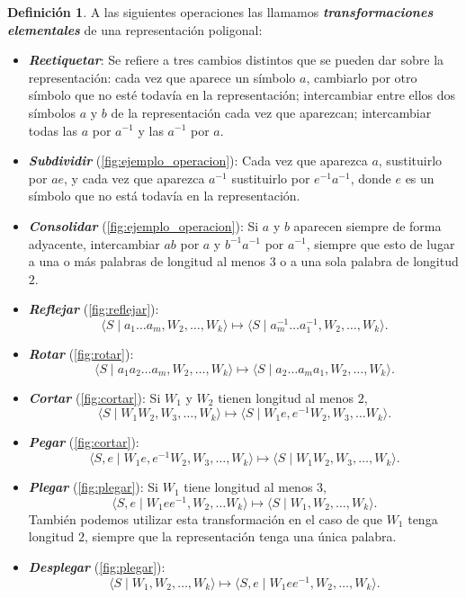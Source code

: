 \documentclass[10pt]{report}
\newcommand{\enfatiza}[1]{\textbf{\textit{#1}}}
\theoremstyle{definition}
\newtheorem{defin}{Definición}[section]
\begin{document}
\begin{defin}%
A las siguientes operaciones las llamamos \enfatiza{transformaciones elementales} de una representación poligonal:
\begin{itemize}
\item \enfatiza{Reetiquetar}: Se refiere a tres cambios distintos que se pueden dar sobre la representación: cada vez que aparece un símbolo $a$, cambiarlo por otro símbolo que no esté todavía en la representación; intercambiar entre ellos dos símbolos $a$ y $b$ de la representación cada vez que aparezcan; intercambiar todas las $a$ por $a^{-1}$ y las $a^{-1}$ por $a$.
\item \enfatiza{Subdividir} (\autoref{fig:ejemplo_operacion}): Cada vez que aparezca $a$, sustituirlo por $ae$, y cada vez que aparezca $a^{-1}$ sustituirlo por $e^{-1}a^{-1}$, donde $e$ es un símbolo que no está todavía en la representación.
\item \enfatiza{Consolidar} (\autoref{fig:ejemplo_operacion}): Si $a$ y $b$ aparecen siempre de forma adyacente, intercambiar $ab$ por $a$ y $b^{-1}a^{-1}$ por $a^{-1}$, siempre que esto de lugar a una o más palabras de longitud al menos $3$ o a una sola palabra de longitud $2$.
\item \enfatiza{Reflejar} (\autoref{fig:reflejar}): $$\langle S\mid   a_1 \dots a_m, W_2,\dots,W_k\rangle \mapsto \langle S\mid   a_m^{-1}\dots a_1^{-1}, W_2, \dots ,W_k\rangle .$$
\item \enfatiza{Rotar} (\autoref{fig:rotar}): $$\langle S\mid a_1a_2\dots a_m, W_2,\dots , W_k\rangle \mapsto \langle S\mid   a_2\dots a_ma_1, W_2,\dots , W_k\rangle .$$
\item \enfatiza{Cortar} (\autoref{fig:cortar}): Si $W_1$ y $W_2$ tienen longitud al menos $2$, $$\langle S\mid W_1W_2, W_3,\dots , W_k\rangle \mapsto \langle S\mid W_1e, e^{-1}W_2, W_3,\dots W_k\rangle .$$ 
\item \enfatiza{Pegar} (\autoref{fig:cortar}): $$\langle S,e\mid W_1e, e^{-1}W_2, W_3,\dots , W_k\rangle \mapsto \langle S\mid W_1W_2, W_3,\dots , W_k\rangle .$$
\item \enfatiza{Plegar} (\autoref{fig:plegar}): Si $W_1$ tiene longitud al menos $3$, $$\langle S,e\mid W_1ee^{-1}, W_2,\dots W_k\rangle \mapsto \langle S\mid W_1, W_2,\dots , W_k\rangle .$$ También podemos utilizar esta transformación en el caso de que $W_1$ tenga longitud $2$, siempre que la representación tenga una única palabra.
\item \enfatiza{Desplegar} (\autoref{fig:plegar}): $$\langle S\mid W_1, W_2,\dots , W_k\rangle \mapsto \langle S,e\mid W_1ee^{-1}, W_2,\dots , W_k\rangle .$$
\end{itemize}
\end{defin}
\end{document}
